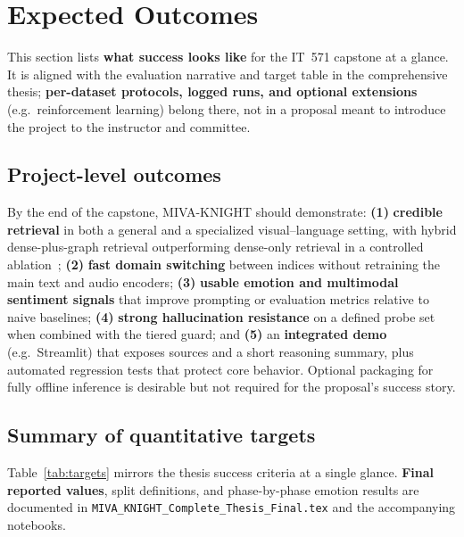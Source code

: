 \documentclass[12pt, a4paper]{article}
\begin{document}
\section{Expected Outcomes}

This section lists \textbf{what success looks like} for the IT~571 capstone at a
glance. It is aligned with the evaluation narrative and target table in the
comprehensive thesis; \textbf{per-dataset protocols, logged runs, and optional
extensions} (e.g.\ reinforcement learning) belong there, not in a proposal
meant to introduce the project to the instructor and committee.

\subsection{Project-level outcomes}

By the end of the capstone, MIVA-KNIGHT should demonstrate: \textbf{(1)}
\textbf{credible retrieval} in both a general and a specialized visual--language
setting, with hybrid dense-plus-graph retrieval outperforming dense-only
retrieval in a controlled ablation~\cite{sarmah2024hybridrag}; \textbf{(2)}
\textbf{fast domain switching} between indices without retraining the main text
and audio encoders; \textbf{(3)} \textbf{usable emotion and multimodal sentiment
signals} that improve prompting or evaluation metrics relative to naive
baselines; \textbf{(4)} \textbf{strong hallucination resistance} on a defined
probe set when combined with the tiered guard; and \textbf{(5)} an
\textbf{integrated demo} (e.g.\ Streamlit) that exposes sources and a short
reasoning summary, plus automated regression tests that protect core behavior.
Optional packaging for fully offline inference is desirable but not required for
the proposal's success story.

\subsection{Summary of quantitative targets}

Table~\ref{tab:targets} mirrors the thesis success criteria at a single glance.
\textbf{Final reported values}, split definitions, and phase-by-phase emotion
results are documented in \texttt{MIVA\_KNIGHT\_Complete\_Thesis\_Final.tex} and
the accompanying notebooks.
\end{document}
